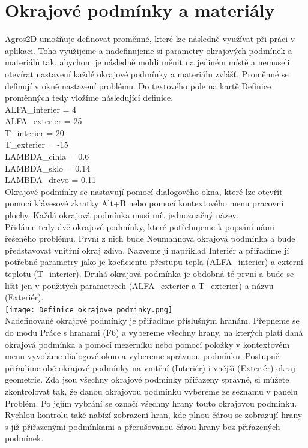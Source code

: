 \documentclass[a4paper, oneside]{article}
\begin{document}
\section{Okrajové podmínky a materiály}
\indent Agros2D umožňuje definovat proměnné, které lze následně využívat při práci v aplikaci. Toho využijeme a nadefinujeme si parametry okrajových podmínek a materiálů tak, abychom je následně mohli měnit na jediném místě a nemuseli otevírat nastavení každé okrajové podmínky a materiálu zvlášť. Proměnné se definují v okně nastavení problému. Do textového pole na kartě Definice proměnných tedy vložíme následující definice.\\
ALFA\_interier = 4\\
ALFA\_exterier = 25\\
T\_interier = 20\\
T\_exterier = -15\\
LAMBDA\_cihla = 0.6\\
LAMBDA\_sklo = 0.14\\
LAMBDA\_drevo = 0.11\\
\indent Okrajové podmínky se nastavují pomocí dialogového okna, které lze otevřít pomocí klávesové zkratky Alt+B nebo pomocí kontextového menu pracovní plochy. Každá okrajová podmínka musí mít jednoznačný název.\\
\indent Přidáme tedy dvě okrajové podmínky, které potřebujeme k popsání námi řešeného problému. První z nich bude Neumannova okrajová podmínka a bude představovat vnitřní okraj zdiva. Nazveme ji například Interiér a přiřadíme jí potřebné parametry jako je koeficientu přestupu tepla (ALFA\_interier) a externí teplotu (T\_interier). Druhá okrajová podmínka je obdobná té první a bude se lišit jen v použitých parametrech (ALFA\_exterier a T\_exterier) a názvu (Exteriér).\\
\texttt{[image: Definice\_okrajove\_podminky.png]}\\
\indent Nadefinované okrajové podmínky je přiřadíme příslušným hranám. Přepneme se do modu Práce s hranami (F6) a vybereme všechny hrany, na kterých platí daná okrajová podmínka a pomocí mezerníku nebo pomocí položky v kontextovém menu vyvoláme dialogové okno a vybereme správnou podmínku. Postupně přiřadíme obě okrajové podmínky na vnitřní (Interiér) i vnější (Exteriér) okraj geometrie. Zda jsou všechny okrajové podmínky přiřazeny správně, si můžete zkontrolovat tak, že danou okrajovou podmínku vybereme ze seznamu v panelu Problém. Po jejím vybrání se označí všechny hrany touto okrajovou podmínku. Rychlou kontrolu také nabízí zobrazení hran, kde plnou čárou se zobrazují hrany s již přiřazenými podmínkami a přerušovanou čárou hrany bez přiřazených podmínek.\\
\end{document}
